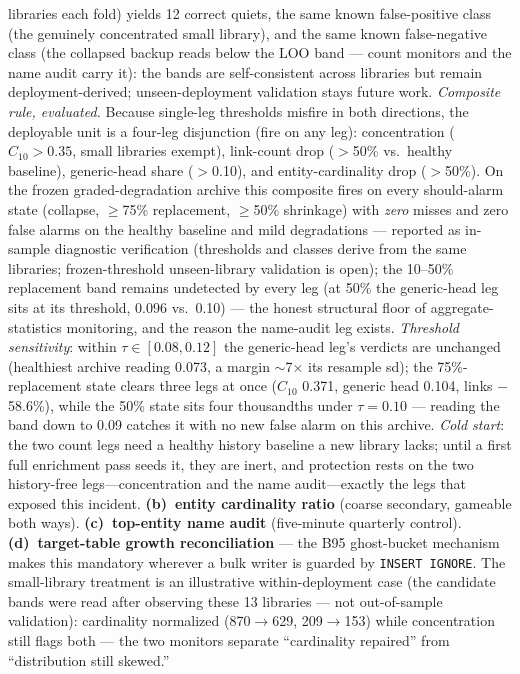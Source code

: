 \documentclass[sigconf,nonacm,anonymous]{acmart}
\begin{document}
libraries each fold) yields 12 correct quiets, the same known
false-positive class (the genuinely concentrated small library),
and the same known false-negative class (the collapsed backup reads
below the LOO band --- count monitors and the name audit carry it):
the bands are self-consistent across libraries but remain
deployment-derived; unseen-deployment validation stays future work.
\emph{Composite rule, evaluated.} Because single-leg thresholds
misfire in both directions, the deployable unit is a four-leg
disjunction (fire on any leg): concentration ($C_{10}{>}0.35$, small
libraries exempt), link-count drop ($>$50\% vs.\ healthy baseline),
generic-head share ($>$0.10), and entity-cardinality drop ($>$50\%).
On the frozen graded-degradation archive this composite fires on
every should-alarm state (collapse, ${\ge}$75\% replacement,
${\ge}$50\% shrinkage) with \emph{zero} misses and zero false alarms
on the healthy baseline and mild degradations --- reported as in-sample
diagnostic verification (thresholds and classes derive from the same
libraries; frozen-threshold unseen-library validation is open); the
10--50\%
replacement band remains undetected by every leg (at 50\% the
generic-head leg sits at its threshold, 0.096 vs.\ 0.10) --- the
honest structural floor of aggregate-statistics monitoring, and the
reason the name-audit leg exists. \emph{Threshold sensitivity}:
within $\tau \in [0.08, 0.12]$ the generic-head leg's verdicts are
unchanged (healthiest archive reading 0.073, a margin ${\sim}$7$\times$
its resample sd); the 75\%-replacement state clears three legs at once
($C_{10}$ 0.371, generic head 0.104, links $-$58.6\%), while the
50\% state sits four thousandths under $\tau{=}0.10$ --- reading the
band down to 0.09 catches it with no new false alarm on this archive.
\emph{Cold start}: the two count
legs need a healthy history baseline a new library lacks; until a
first full enrichment pass seeds it, they are inert, and protection
rests on the two history-free legs---concentration and the name
audit---exactly the legs that exposed this incident.
\textbf{(b)~entity
cardinality ratio} (coarse secondary, gameable both ways).
\textbf{(c)~top-entity name audit} (five-minute quarterly control).
\textbf{(d)~target-table growth reconciliation} --- the B95
ghost-bucket mechanism makes this mandatory wherever a bulk writer is
guarded by \texttt{INSERT IGNORE}. The small-library treatment is an
illustrative within-deployment case (the candidate bands were read after
observing these 13 libraries --- not out-of-sample validation):
cardinality normalized (870$\to$629,
209$\to$153) while concentration still flags both --- the two monitors
separate ``cardinality repaired'' from ``distribution still skewed.''
\end{document}

